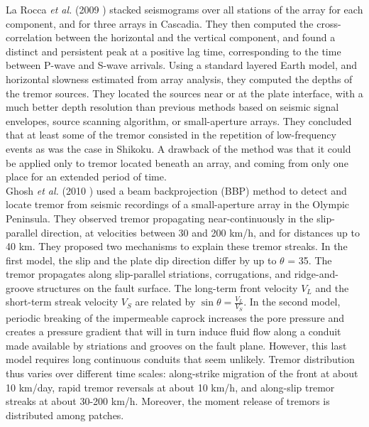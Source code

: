 \documentclass[main.tex]{subfiles}
\begin{document}
La Rocca \textit{et al.} (2009 \cite{LAR_2009}) stacked seismograms over all stations of the array for each component, and for three arrays in Cascadia. They then computed the cross-correlation between the horizontal and the vertical component, and found a distinct and persistent peak at a positive lag time, corresponding to the time between P-wave and S-wave arrivals. Using a standard layered Earth model, and horizontal slowness estimated from array analysis, they computed the depths of the tremor sources. They located the sources near or at the plate interface, with a much better depth resolution than previous methods based on seismic signal envelopes, source scanning algorithm, or small-aperture arrays. They concluded that at least some of the tremor consisted in the repetition of low-frequency events as was the case in Shikoku. A drawback of the method was that it could be applied only to tremor located beneath an array, and coming from only one place for an extended period of time. \\

Ghosh \textit{et al.} (2010 \cite{GHO_2010_G3}) used a beam backprojection (BBP) method to detect and locate tremor from seismic recordings of a small-aperture array in the Olympic Peninsula. They observed tremor propagating near-continuously in the slip-parallel direction, at velocities between 30 and 200 km/h, and for distances up to 40 km. They proposed two mechanisms to explain these tremor streaks. In the first model, the slip and the plate dip direction differ by up to $\theta$ = 35\degree. The tremor propagates along slip-parallel striations, corrugations, and ridge-and-groove structures on the fault surface. The long-term front velocity $V_L$ and the short-term streak velocity $V_S$ are related by $\sin \theta = \frac{V_L}{V_S}$. In the second model, periodic breaking of the impermeable caprock increases the pore pressure and creates a pressure gradient that will in turn induce fluid flow along a conduit made available by striations and grooves on the fault plane. However, this last model requires long continuous conduits that seem unlikely. Tremor distribution thus varies over different time scales: along-strike migration of the front at about 10 km/day, rapid tremor reversals at about 10 km/h, and along-slip tremor streaks at about 30-200 km/h. Moreover, the moment release of tremors is distributed among patches. \\
\end{document}
